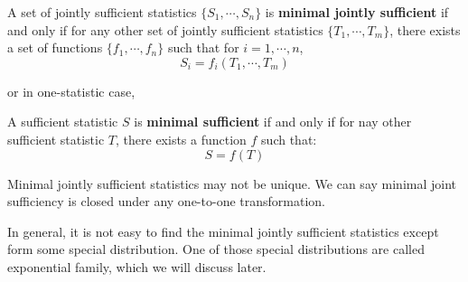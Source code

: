 \documentclass{huhtakm-template-book-v2}
\begin{document}
\begin{defn}
	A set of jointly sufficient statistics $\{S_{1},\cdots,S_{n}\}$ is \textbf{minimal jointly sufficient} if and only if for any other set of jointly sufficient statistics $\{T_{1},\cdots,T_{m}\}$, there exists a set of functions $\{f_{1},\cdots,f_{n}\}$ such that for $i=1,\cdots,n$,
	\begin{equation*}
		S_{i}=f_{i}(T_{1},\cdots,T_{m})
	\end{equation*}
\end{defn}
or in one-statistic case,
\begin{defn}
	A sufficient statistic $S$ is \textbf{minimal sufficient} if and only if for nay other sufficient statistic $T$, there exists a function $f$ such that:
	\begin{equation*}
		S=f(T)
	\end{equation*}
\end{defn}
\begin{rem}
	Minimal jointly sufficient statistics may not be unique. We can say minimal joint sufficiency is closed under any one-to-one transformation.
\end{rem}
In general, it is not easy to find the minimal jointly sufficient statistics except form some special distribution. One of those special distributions are called exponential family, which we will discuss later.

\newpage
\end{document}
